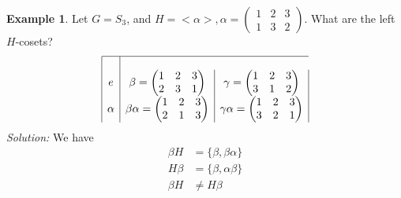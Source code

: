 \documentclass{report}
\theoremstyle{remark}
\theoremstyle{definition}
\theoremstyle{definition}
\newtheorem{example}[theorem]{Example}
\theoremstyle{theorem}
\begin{document}
\begin{example}
Let $G =S_3$, and $H=<\alpha>, \alpha=\begin{pmatrix}1&2&3\\1&3&2\end{pmatrix}$.
What are the left $H$-cosets?
\[
\begin{array}{|c|c|c|}
\hline\\
    e & \beta=\begin{pmatrix}
    1&2&3\\
    2&3&1
    \end{pmatrix}&\gamma=\begin{pmatrix}
    1&2&3\\
    3&1&2
    \end{pmatrix} \\
    \alpha & \beta\alpha=\begin{pmatrix}
    1&2&3\\
    2&1&3
    \end{pmatrix} & \gamma\alpha=\begin{pmatrix}
    1&2&3\\
    3&2&1
    \end{pmatrix}
\end{array}
\]
\emph{Solution:} We have
\begin{align*}
    \beta H& = \{\beta, \beta\alpha\}\\
    H\beta &= \{\beta, \alpha\beta\}\\
    \beta H & \neq H\beta\\
\end{align*}
\end{example}
\end{document}
